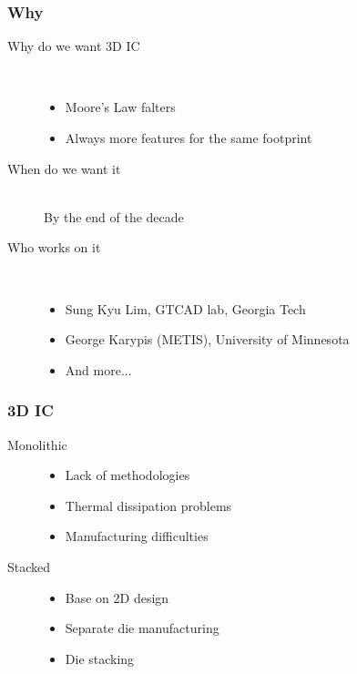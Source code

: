 \documentclass[xcolor={x11names, rgb, usenames, dvipsnames}]{beamer}
\author{Quentin Delhaye}
\title[Partitioning for 3D stacking]{Automated System Partitioning \\ for Efficient 3D Circuit Integration \\\rule{2cm}{0.3pt} ~\\ Work presentation}
\institute[BEAMS]{Université Libre de Bruxelles}
\date{}
\begin{document}
\begin{frame}
\titlepage
\end{frame}


\begin{frame}
  \frametitle{Why}
  \begin{description}
    \item[Why do we want 3D IC]~\\
      \begin{itemize}
        \item Moore's Law falters
        \item Always more features for the same footprint
      \end{itemize}
    \item[When do we want it]~\\
        By the end of the decade
    \item[Who works on it]~\\
      \begin{itemize}
        \item Sung Kyu Lim, GTCAD lab, Georgia Tech
        \item George Karypis (METIS), University of Minnesota
        \item And more...
      \end{itemize}
  \end{description}
\end{frame}

\begin{frame}
  \frametitle{3D IC}
  \begin{description}
    \item[Monolithic]
      \begin{itemize}
        \item Lack of methodologies
        \item Thermal dissipation problems
        \item Manufacturing difficulties
      \end{itemize}
    \item[Stacked]
      \begin{itemize}
        \item Base on 2D design
        \item Separate die manufacturing
        \item Die stacking
      \end{itemize}
  \end{description}
\end{frame}
\end{document}
